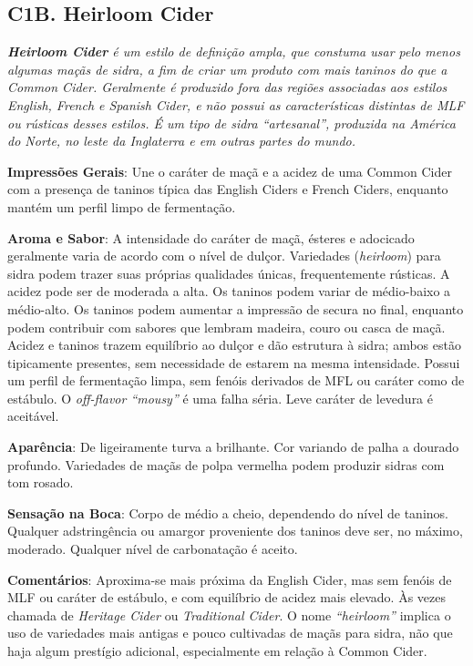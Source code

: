 \subsection*{C1B. Heirloom Cider}

\textit{\textbf{Heirloom Cider} é um estilo de definição ampla, que constuma usar pelo menos algumas maçãs de sidra, a fim de criar um produto com mais taninos do que a Common Cider. Geralmente é produzido fora das regiões associadas aos estilos English, French e Spanish Cider, e não possui as características distintas de MLF ou rústicas desses estilos. É um tipo de sidra “artesanal”, produzida na América do Norte, no leste da Inglaterra e em outras partes do mundo.}

\textbf{Impressões Gerais}: Une o caráter de maçã e a acidez de uma Common Cider com a presença de taninos típica das English Ciders e French Ciders, enquanto mantém um perfil limpo de fermentação.

\textbf{Aroma e Sabor}: A intensidade do caráter de maçã, ésteres e adocicado geralmente varia de acordo com o nível de dulçor. Variedades (\textit{heirloom}) para sidra podem trazer suas próprias qualidades únicas, frequentemente rústicas. A acidez pode ser de moderada a alta. Os taninos podem variar de médio-baixo a médio-alto. Os taninos podem aumentar a impressão de secura no final, enquanto podem contribuir com sabores que lembram madeira, couro ou casca de maçã. Acidez e taninos trazem equilíbrio ao dulçor e dão estrutura à sidra; ambos estão tipicamente presentes, sem necessidade de estarem na mesma intensidade. Possui um perfil de fermentação limpa, sem fenóis derivados de MFL ou caráter como de estábulo. O \textit{off-flavor “mousy”} é uma falha séria. Leve caráter de levedura é aceitável.

\textbf{Aparência}: De ligeiramente turva a brilhante. Cor variando de palha a dourado profundo. Variedades de maçãs de polpa vermelha podem produzir sidras com tom rosado.

\textbf{Sensação na Boca}: Corpo de médio a cheio, dependendo do nível de taninos. Qualquer adstringência ou amargor proveniente dos taninos deve ser, no máximo, moderado. Qualquer nível de carbonatação é aceito.

\textbf{Comentários}: Aproxima-se mais próxima da English Cider, mas sem fenóis de MLF ou caráter de estábulo, e com equilíbrio de acidez mais elevado. Às vezes chamada de \textit{Heritage Cider} ou \textit{Traditional Cider}. O nome \textit{“heirloom”} implica o uso de variedades mais antigas e pouco cultivadas de maçãs para sidra, não que haja algum prestígio adicional, especialmente em relação à Common Cider.

